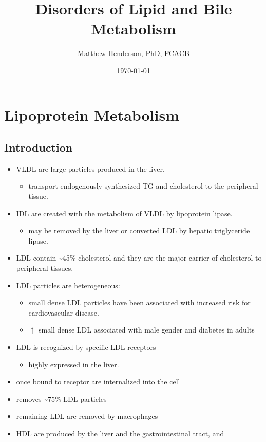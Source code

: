 \documentclass{scrartcl}
\author{Matthew Henderson, PhD, FCACB}
\date{\today}
\title{Disorders of Lipid and Bile Metabolism}
\begin{document}
\maketitle
\tableofcontents


\section{Lipoprotein Metabolism}
\label{sec:org713930e}
\subsection{Introduction}
\label{sec:orgcaeb253}
\begin{itemize}
\item VLDL are large particles produced in the liver.
\begin{itemize}
\item transport endogenously synthesized TG and cholesterol to the peripheral tissue.
\end{itemize}
\item IDL are created with the metabolism of VLDL by lipoprotein lipase.
\begin{itemize}
\item may be removed by the liver or converted LDL by hepatic triglyceride lipase.
\end{itemize}
\item LDL contain \textasciitilde{}45\% cholesterol and they are the major carrier of
cholesterol to peripheral tissues.
\item LDL particles are heterogeneous:
\begin{itemize}
\item small dense LDL particles have been associated with increased risk
for cardiovascular disease.
\item \(\uparrow\) small dense LDL associated with male gender and diabetes in adults
\end{itemize}
\item LDL is recognized by specific LDL receptors
\begin{itemize}
\item highly expressed in the liver.
\end{itemize}
\item once bound to receptor are internalized into the cell
\item removes \textasciitilde{}75\% LDL particles
\item remaining LDL are removed by macrophages
\item HDL are produced by the liver and the gastrointestinal tract, and

\end{itemize}
\end{document}
